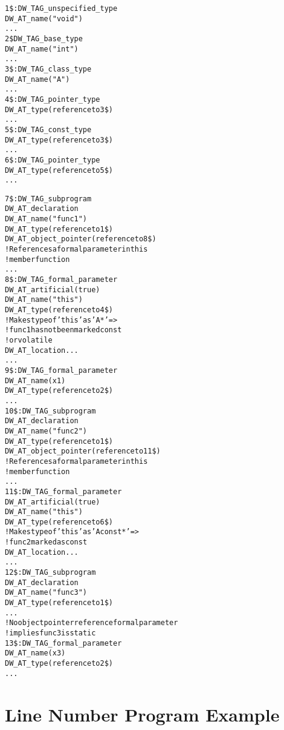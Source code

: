 \begin{alltt}
1\$: DW\_TAG\_unspecified\_type
        DW\_AT\_name("void")
                ...
2\$ DW\_TAG\_base\_type
        DW\_AT\_name("int")
        ...
3\$: DW\_TAG\_class\_type
        DW\_AT\_name("A")
        ...
4\$:    DW\_TAG\_pointer\_type
            DW\_AT\_type(reference to 3\$)
            ...
5\$:    DW\_TAG\_const\_type
            DW\_AT\_type(reference to 3\$)
            ...
6\$:    DW\_TAG\_pointer\_type
            DW\_AT\_type(reference to 5\$)
            ...

7\$:    DW\_TAG\_subprogram
            DW\_AT\_declaration
            DW\_AT\_name("func1")
            DW\_AT\_type(reference to 1\$)
            DW\_AT\_object\_pointer(reference to 8\$)
                ! References a formal parameter in this 
                ! member function
            ...
8\$:        DW\_TAG\_formal\_parameter
                DW\_AT\_artificial(true)
                DW\_AT\_name("this")
                DW\_AT\_type(reference to 4\$)
                    ! Makes type of 'this' as 'A*' =>
                    ! func1 has not been marked const 
                    ! or volatile
                DW\_AT\_location ...
                ...
9\$:        DW\_TAG\_formal\_parameter
                DW\_AT\_name(x1)
                DW\_AT\_type(reference to 2\$)
                ...
10\$:    DW\_TAG\_subprogram
             DW\_AT\_declaration
             DW\_AT\_name("func2")
             DW\_AT\_type(reference to 1\$)
             DW\_AT\_object\_pointer(reference to 11\$)
             ! References a formal parameter in this 
             ! member function
             ...
11\$:        DW\_TAG\_formal\_parameter
                 DW\_AT\_artificial(true)
                 DW\_AT\_name("this")
                 DW\_AT\_type(reference to 6\$)
                     ! Makes type of 'this' as 'A const*' =>
                 !     func2 marked as const
                 DW\_AT\_location ...
                 ...
12\$:    DW\_TAG\_subprogram
             DW\_AT\_declaration
             DW\_AT\_name("func3")
             DW\_AT\_type(reference to 1\$)
             ...
                 ! No object pointer reference formal parameter
                 ! implies func3 is static
13\$:        DW\_TAG\_formal\_parameter
                 DW\_AT\_name(x3)
                 DW\_AT\_type(reference to 2\$)
                 ...
\end{alltt}

\section{Line Number Program Example}
\label{app:linenumberprogramexample}

